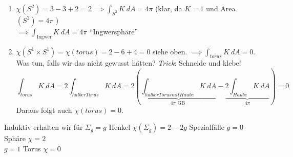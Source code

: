 \documentclass[../main.tex]{subfiles}
\begin{document}
\begin{examples}
\leavevmode
\begin{enumerate}
    \item $\chi (S^2) = 3 - 3 + 2 = 2 \implies \int_{S^2} K \ dA = 4\pi$
    (klar, da $K=1$ und Area$(S^2) = 4\pi$ )\\
    $\implies \int_{\text{Ingwer}} K \ dA = 4 \pi$ ``Ingwersphäre''
    
    \item $\chi (S^1 \times S^1) = \chi(torus) = 2 - 6 + 4 = 0$ siehe oben.
    $\implies \int_{torus} K \ dA = 0$. \\
    Was tun, falls wir das nicht gewusst hätten?
    \emph{Trick}: Schneide und klebe!
    $$\int_{torus} K \ dA = 2 \int _{halber Torus} K \ dA = 2 \left( \underbrace{\int _{halber Torus mit Haube} K \ dA}_{4\pi \text{ GB }} - \underbrace{2 \int _{Haube} K \ dA}_{4\pi} \right) = 0$$
    Daraus folgt auch $\chi (torus) = 0$.

\end{enumerate}

Induktiv erhalten wir für $\Sigma _g = g$ Henkel
$\chi(\Sigma _g) = 2 - 2g$
Spezialfälle $g=0$ Sphäre $\chi = 2$\\
$g=1$ Torus $\chi = 0$



\end{examples}
\end{document}
